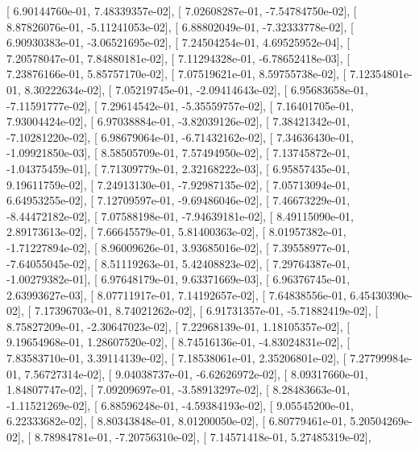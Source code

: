 \documentclass{article}
\begin{document}
       [  6.90144760e-01,   7.48339357e-02],
       [  7.02608287e-01,  -7.54784750e-02],
       [  8.87826076e-01,  -5.11241053e-02],
       [  6.88802049e-01,  -7.32333778e-02],
       [  6.90930383e-01,  -3.06521695e-02],
       [  7.24504254e-01,   4.69525952e-04],
       [  7.20578047e-01,   7.84880181e-02],
       [  7.11294328e-01,  -6.78652418e-03],
       [  7.23876166e-01,   5.85757170e-02],
       [  7.07519621e-01,   8.59755738e-02],
       [  7.12354801e-01,   8.30222634e-02],
       [  7.05219745e-01,  -2.09414643e-02],
       [  6.95683658e-01,  -7.11591777e-02],
       [  7.29614542e-01,  -5.35559757e-02],
       [  7.16401705e-01,   7.93004424e-02],
       [  6.97038884e-01,  -3.82039126e-02],
       [  7.38421342e-01,  -7.10281220e-02],
       [  6.98679064e-01,  -6.71432162e-02],
       [  7.34636430e-01,  -1.09921850e-03],
       [  8.58505709e-01,   7.57494950e-02],
       [  7.13745872e-01,  -1.04375459e-01],
       [  7.71309779e-01,   2.32168222e-03],
       [  6.95857435e-01,   9.19611759e-02],
       [  7.24913130e-01,  -7.92987135e-02],
       [  7.05713094e-01,   6.64953255e-02],
       [  7.12709597e-01,  -9.69486046e-02],
       [  7.46673229e-01,  -8.44472182e-02],
       [  7.07588198e-01,  -7.94639181e-02],
       [  8.49115090e-01,   2.89173613e-02],
       [  7.66645579e-01,   5.81400363e-02],
       [  8.01957382e-01,  -1.71227894e-02],
       [  8.96009626e-01,   3.93685016e-02],
       [  7.39558977e-01,  -7.64055045e-02],
       [  8.51119263e-01,   5.42408823e-02],
       [  7.29764387e-01,  -1.00279382e-01],
       [  6.97648179e-01,   9.63371669e-03],
       [  6.96376745e-01,   2.63993627e-03],
       [  8.07711917e-01,   7.14192657e-02],
       [  7.64838556e-01,   6.45430390e-02],
       [  7.17396703e-01,   8.74021262e-02],
       [  6.91731357e-01,  -5.71882419e-02],
       [  8.75827209e-01,  -2.30647023e-02],
       [  7.22968139e-01,   1.18105357e-02],
       [  9.19654968e-01,   1.28607520e-02],
       [  8.74516136e-01,  -4.83024831e-02],
       [  7.83583710e-01,   3.39114139e-02],
       [  7.18538061e-01,   2.35206801e-02],
       [  7.27799984e-01,   7.56727314e-02],
       [  9.04038737e-01,  -6.62626972e-02],
       [  8.09317660e-01,   1.84807747e-02],
       [  7.09209697e-01,  -3.58913297e-02],
       [  8.28483663e-01,  -1.11521269e-02],
       [  6.88596248e-01,  -4.59384193e-02],
       [  9.05545200e-01,   6.22333682e-02],
       [  8.80343848e-01,   8.01200050e-02],
       [  6.80779461e-01,   5.20504269e-02],
       [  8.78984781e-01,  -7.20756310e-02],
       [  7.14571418e-01,   5.27485319e-02],
\end{document}
